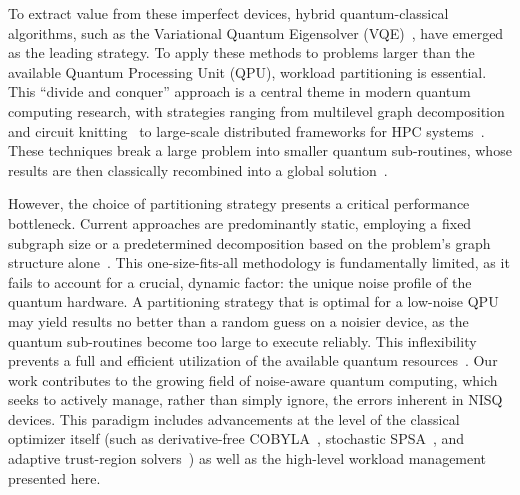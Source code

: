 \documentclass[pdflatex,sn-mathphys-num]{sn-jnl}
\theoremstyle{thmstyleone}
\theoremstyle{thmstyletwo}%
\theoremstyle{thmstylethree}%
\begin{document}
To extract value from these imperfect devices, hybrid quantum-classical algorithms, such as the Variational Quantum Eigensolver (VQE)~\cite{Peruzzo2013AVEM}, have emerged as the leading strategy. To apply these methods to problems larger than the available Quantum Processing Unit (QPU), workload partitioning is essential. This ``divide and conquer'' approach is a central theme in modern quantum computing research, with strategies ranging from multilevel graph decomposition~\cite{Angone2023HybridQMD} and circuit knitting~\cite{Bhatotia2024QuantumClassicalCVH} to large-scale distributed frameworks for HPC systems~\cite{Xu2025GPUAcceleratedDQF, Tang2022ScaleQCASX, Sweeney2025DynamicHPAH}. These techniques break a large problem into smaller quantum sub-routines, whose results are then classically recombined into a global solution~\cite{Esposito2023AHCAF, Cranganore2024PavingTWP}.

However, the choice of partitioning strategy presents a critical performance bottleneck. Current approaches are predominantly static, employing a fixed subgraph size or a predetermined decomposition based on the problem's graph structure alone~\cite{Khare2023ParallelizingQWE}. This one-size-fits-all methodology is fundamentally limited, as it fails to account for a crucial, dynamic factor: the unique noise profile of the quantum hardware. A partitioning strategy that is optimal for a low-noise QPU may yield results no better than a random guess on a noisier device, as the quantum sub-routines become too large to execute reliably. This inflexibility prevents a full and efficient utilization of the available quantum resources~\cite{Khare2023ParallelizingQWE, Acampora2025QuantumCAR}. Our work contributes to the growing field of noise-aware quantum computing, which seeks to actively manage, rather than simply ignore, the errors inherent in NISQ devices. This paradigm includes advancements at the level of the classical optimizer itself (such as derivative-free COBYLA~\cite{Powell1994ADF}, stochastic SPSA~\cite{Spall1992MultivariateSA}, and adaptive trust-region solvers~\cite{dzahini2025noise}) as well as the high-level workload management presented here.
\end{document}
